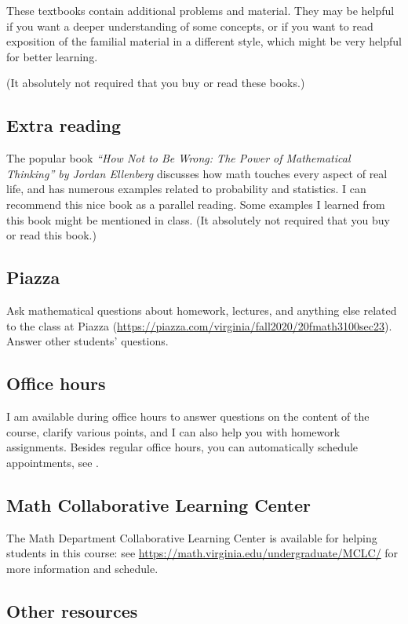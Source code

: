 \documentclass[oneside,11pt]{amsart}
\begin{document}
These textbooks contain additional problems and material. They may be helpful if you want
a deeper understanding of some concepts, or if you want to read exposition of the familial material
in a different style, which might be very helpful for better learning.

(It absolutely not required that you buy or read these books.)

\subsection{Extra reading}

The popular book
\emph{``How Not to Be Wrong: The Power of Mathematical Thinking'' by Jordan Ellenberg}
discusses how math touches every aspect of real life, and has 
numerous examples related to probability and statistics. 
I can recommend this nice book as a parallel reading. Some
examples I learned from this book might be mentioned in class.
(It absolutely not required that you buy or read this book.)

\subsection{Piazza}

Ask mathematical questions about homework, lectures, and anything else
related to the class at Piazza (\url{https://piazza.com/virginia/fall2020/20fmath3100sec23}).
Answer other students' questions.


\subsection{Office hours}

I am available during office hours to answer questions on the content of the 
course, clarify various points, and I can also help you with homework assignments. 
Besides regular office hours, you can automatically schedule appointments, see 
.

\subsection{Math Collaborative Learning Center}

The Math Department 
Collaborative Learning Center
is available for helping students in this course: 
see \url{https://math.virginia.edu/undergraduate/MCLC/}
for more information and schedule. 

\subsection{Other resources}
\end{document}
